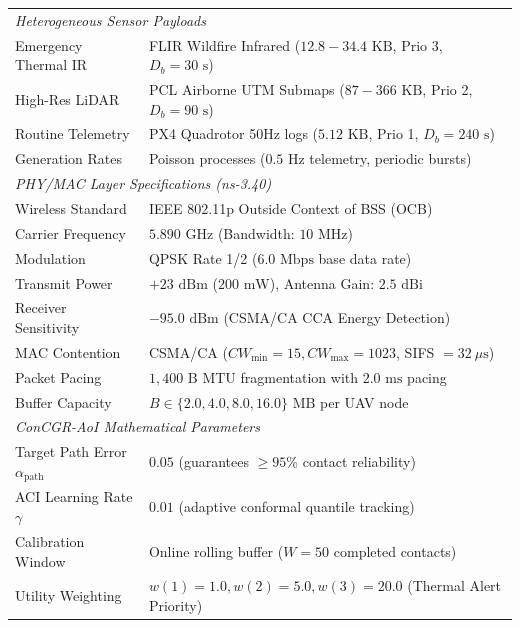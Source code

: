 \begin{table}[t]
{\begin{tabular}{ll}
\midrule
\multicolumn{2}{l}{\textit{Heterogeneous Sensor Payloads}} \\
Emergency Thermal IR & FLIR Wildfire Infrared ($12.8 - 34.4\text{ KB}$, Prio 3, $D_b = 30\text{ s}$) \\
High-Res LiDAR & PCL Airborne UTM Submaps ($87 - 366\text{ KB}$, Prio 2, $D_b = 90\text{ s}$) \\
Routine Telemetry & PX4 Quadrotor 50Hz logs ($5.12\text{ KB}$, Prio 1, $D_b = 240\text{ s}$) \\
Generation Rates & Poisson processes ($0.5\text{ Hz}$ telemetry, periodic bursts) \\
\midrule
\multicolumn{2}{l}{\textit{PHY/MAC Layer Specifications (ns-3.40)}} \\
Wireless Standard & IEEE 802.11p Outside Context of BSS (OCB) \\
Carrier Frequency & $5.890\text{ GHz}$ (Bandwidth: $10\text{ MHz}$) \\
Modulation & QPSK Rate 1/2 ($6.0\text{ Mbps}$ base data rate) \\
Transmit Power & $+23\text{ dBm}$ ($200\text{ mW}$), Antenna Gain: $2.5\text{ dBi}$ \\
Receiver Sensitivity & $-95.0\text{ dBm}$ (CSMA/CA CCA Energy Detection) \\
MAC Contention & CSMA/CA ($CW_{\min} = 15, CW_{\max} = 1023$, SIFS $= 32\ \mu\text{s}$) \\
Packet Pacing & $1,400\text{ B}$ MTU fragmentation with $2.0\text{ ms}$ pacing \\
Buffer Capacity & $B \in \{2.0, 4.0, 8.0, 16.0\}\text{ MB}$ per UAV node \\
\midrule
\multicolumn{2}{l}{\textit{ConCGR-AoI Mathematical Parameters}} \\
Target Path Error $\alpha_{\text{path}}$ & $0.05$ (guarantees $\ge 95\%$ contact reliability) \\
ACI Learning Rate $\gamma$ & $0.01$ (adaptive conformal quantile tracking) \\
Calibration Window & Online rolling buffer ($W = 50$ completed contacts) \\
Utility Weighting & $w(1)=1.0, w(2)=5.0, w(3)=20.0$ (Thermal Alert Priority) \\
\bottomrule
\end{tabular}%
}
\end{table}
